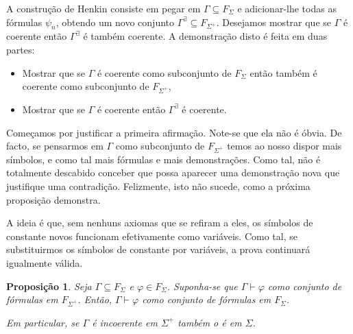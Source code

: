 \documentclass{report}
\newtheorem{prop}{Proposição}
\theoremstyle{definition}
\theoremstyle{remark}
\begin{document}
	A construção de Henkin consiste em pegar em $\Gamma \subseteq F_{\Sigma}$ e adicionar-lhe todas as fórmulas $\psi_n$, obtendo um novo conjunto $\Gamma^\exists \subseteq F_{\Sigma^+}$. Desejamos mostrar que se $\Gamma$ é coerente então $\Gamma^\exists$ é também coerente. A demonstração disto é feita em duas partes:
	
	\begin{itemize}
	\item Mostrar que se $\Gamma$ é coerente como subconjunto de $F_\Sigma$ então também é coerente como subconjunto de $F_{\Sigma^+}$,
	
	\item Mostrar que se $\Gamma$ é coerente então $\Gamma^\exists$ é coerente.
	\end{itemize}
	
	Começamos por justificar a primeira afirmação. Note-se que ela não é óbvia. De facto, se pensarmos em $\Gamma$ como subconjunto de $F_{\Sigma^+}$ temos ao nosso dispor mais símbolos, e como tal mais fórmulas e mais demonstrações. Como tal, não é totalmente descabido conceber que possa aparecer uma demonstração nova que justifique uma contradição. Felizmente, isto não sucede, como a próxima proposição demonstra.
	
	A ideia é que, sem nenhuns axiomas que se refiram a eles, os símbolos de constante novos funcionam efetivamente como variáveis. Como tal, se substituirmos os símbolos de constante por variáveis, a prova continuará igualmente válida.
	
	\begin{prop}\label{coherenceinplus}
	Seja $\Gamma \subseteq F_\Sigma$ e $\varphi \in F_\Sigma$. Suponha-se que $\Gamma \vdash \varphi$ como conjunto de fórmulas em $F_{\Sigma^+}$. Então, $\Gamma \vdash \varphi$ como conjunto de fórmulas em $F_\Sigma$.
	
	Em particular, se $\Gamma$ é incoerente em $\Sigma^+$ também o é em $\Sigma$.
	\end{prop}
	
\end{document}
